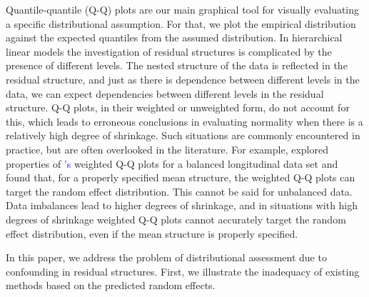 \documentclass[12pt]{article} %
\newcommand{\citetapos}[1]{\citeauthor{#1}{\textcolor{blue}{'s}} }
\newcommand{\al}[1]{{\color{red} #1}}
\begin{document}
Quantile-quantile (Q-Q) plots \citep{Wilk:1968} are our main graphical tool for  visually evaluating a specific distributional assumption. For that, we plot the empirical distribution against the expected quantiles from the assumed distribution. 
In hierarchical linear models the investigation of residual structures is complicated by the presence of  different levels. 
The nested structure of the data is reflected in the residual structure, and just as there is dependence between different levels in the data, we can expect dependencies between different levels in the residual structure. 
Q-Q plots, in their weighted \citep{Dempster:1985tr, Lange:1989uu} or unweighted {form}, do not account for this, which leads to erroneous conclusions in evaluating normality when there is a relatively high degree of shrinkage. Such situations are commonly encountered in practice, but are often overlooked in the literature. For example, \cite{Eberly:2005ee} explored properties of \citetapos{Lange:1989uu} weighted Q-Q plots for a balanced longitudinal data set and found that, for a properly specified mean structure, the weighted Q-Q plots can target the random effect distribution. This cannot be said for unbalanced data. Data imbalances lead to higher degrees of shrinkage, and in situations with high degrees of shrinkage weighted Q-Q plots  cannot accurately target the random effect distribution, even if the mean structure is properly specified.




In this paper, we address the problem of distributional assessment due to confounding in residual structures. 
First, we illustrate the inadequacy of existing methods based on the predicted random effects.
\end{document}
